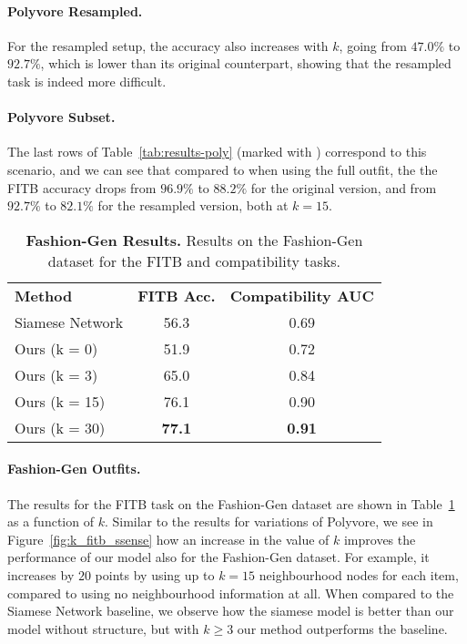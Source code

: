 \documentclass[10pt,twocolumn,letterpaper]{article}
\begin{document}
\paragraph{Polyvore Resampled.} 
For the resampled setup, the accuracy also increases with $k$, going from $47.0\%$ to $92.7\%$, which is lower than its original counterpart, showing that the resampled task is indeed more difficult.

\paragraph{Polyvore Subset.} 
The last rows of Table~\ref{tab:results-poly} (marked with \textdagger) correspond to this scenario, and we can see that compared to when using the full outfit, the the FITB accuracy drops from $96.9\%$ to $88.2\%$ for the original version, and from $92.7\%$ to $82.1\%$ for the resampled version, both at $k=15$.

\begin{table}[t]
\caption{\textbf{Fashion-Gen Results.} Results on the Fashion-Gen dataset for the FITB and compatibility tasks.}
\vskip-0cm
\label{tab:results-fgen}
\begin{center}
\begin{tabular}{l|cc}
\textbf{Method} & \textbf{FITB Acc.} & \textbf{Compatibility AUC}\\\shline
Siamese Network         & 56.3 &  0.69 \\     
 \hline
Ours (k = 0)            & 51.9 &  0.72  \\
Ours (k = 3)            & 65.0 &  0.84  \\
Ours (k = 15)           & 76.1 &  0.90  \\
Ours (k = 30)           & \textbf{77.1} &  \textbf{0.91}  \\
\end{tabular}
\end{center}
\end{table}

\paragraph{Fashion-Gen Outfits.}


The results for the FITB task on the Fashion-Gen dataset are shown in Table~\ref{tab:results-fgen} as a function of $k$. Similar to the results for variations of Polyvore, we see in Figure~\ref{fig:k_fitb_ssense} how an increase in the value of $k$ improves the performance of our model also for 
the Fashion-Gen dataset. For example, it increases by $20$ points by using up to $k=15$ neighbourhood nodes for each item, compared to using no neighbourhood information at all. When compared to the Siamese Network baseline, we observe how the siamese model is better than our model without structure, but with $k \geq 3$ our method outperforms the baseline.
\end{document}
